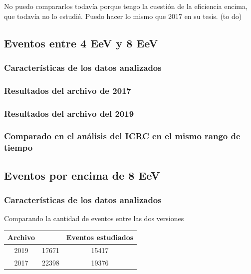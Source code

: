 						No puedo compararlos todavía porque tengo la cuestión de la eficiencia encima, que todavía no lo  estudié. Puedo hacer lo mismo que 2017 en su tesis. (to do)


		\subsection{Eventos entre 4 EeV y 8 EeV }
			\subsubsection{Características de los datos analizados}
			\subsubsection{Resultados del archivo de 2017}
			\subsubsection{Resultados del archivo del 2019}
			\subsubsection{Comparado en el análisis del ICRC en el mismo rango de tiempo}


		\subsection{Eventos por encima de 8 EeV }

			\subsubsection{Características de los datos analizados}

				Comparando la cantidad de eventos entre las dos versiones %
				
				\begin{table}[H]
				\centering
					\begin{tabular}{c|c|c}
					\textbf{Archivo} & \text{Eventos en general} & Eventos estudiados  \\ \hline
					2019			 & 	17671	  				  & 15417\\ 
					2017			 &	22398	   				  & 19376\\
					\end{tabular}
				\end{table}
				
